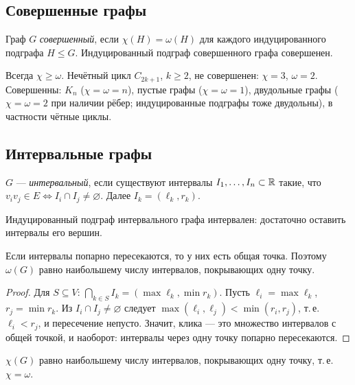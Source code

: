 \subsection*{Совершенные графы}
\begin{definition}
Граф \(G\) \emph{совершенный}, если \(\chi(H)=\omega(H)\) для каждого индуцированного
подграфа \(H\le G\). Индуцированный подграф совершенного графа совершенен.
\end{definition}
Всегда \(\chi\ge\omega\). Нечётный цикл \(C_{2k+1}\), \(k\ge2\), не совершенен:
\(\chi=3\), \(\omega=2\). Совершенны: \(K_n\) (\(\chi=\omega=n\)), пустые графы (\(\chi=\omega=1\)),
двудольные графы (\(\chi=\omega=2\) при наличии рёбер; индуцированные подграфы тоже
двудольны), в частности чётные циклы.

\subsection*{Интервальные графы}
\begin{definition}
\(G\) — \emph{интервальный}, если существуют интервалы \(I_1,\ldots,I_n\subset\mathbb R\) такие, что
\(v_iv_j\in E\iff I_i\cap I_j\ne\varnothing\). Далее \(I_k=(\ell_k,r_k)\).
\end{definition}

\begin{lemma}\label{lem:int-induced}
Индуцированный подграф интервального графа интервален: достаточно оставить
интервалы его вершин.
\end{lemma}
\begin{lemma}\label{lem:helly}
Если интервалы попарно пересекаются, то у них есть общая точка. Поэтому
\(\omega(G)\) равно наибольшему числу интервалов, покрывающих одну точку.
\end{lemma}
\begin{proof}
Для \(S\subseteq V\): \(\bigcap_{k\in S}I_k=(\max\ell_k,\min r_k)\). Пусть \(\ell_i=\max\ell_k\),
\(r_j=\min r_k\). Из \(I_i\cap I_j\ne\varnothing\) следует \(\max(\ell_i,\ell_j)<\min(r_i,r_j)\), т.\,е.
\(\ell_i<r_j\), и пересечение непусто. Значит, клика — это множество интервалов с общей
точкой, и наоборот: интервалы через одну точку попарно пересекаются.
\end{proof}
\begin{lemma}\label{lem:greedy-int}
\(\chi(G)\) равно наибольшему числу интервалов, покрывающих одну точку, т.\,е. \(\chi=\omega\).
\end{lemma}
